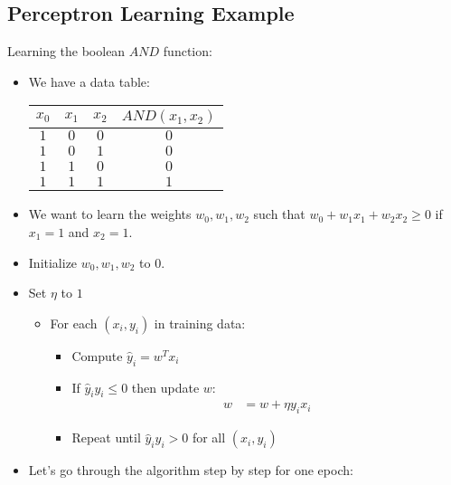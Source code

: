\documentclass[12pt]{article}
\begin{document}
        \subsection{Perceptron Learning Example}
            Learning the boolean $AND$ function:
            \begin{itemize}
                \item We have a data table: \\
                \begin{tabular}{|c|c|c|c|}
                    \hline
                    $x_0$ & $x_1$ & $x_2$ & $AND(x_1, x_2)$ \\
                    \hline
                    $1$ & $0$ & $0$ & $0$ \\
                    \hline
                    $1$ & $0$ & $1$ & $0$ \\
                    \hline
                    $1$ & $1$ & $0$ & $0$ \\
                    \hline
                    $1$ & $1$ & $1$ & $1$ \\
                    \hline
                \end{tabular}
                \item We want to learn the weights $w_0, w_1, w_2$ such that $w_0 + w_1{x_1} + w_2{x_2} \ge 0$ if $x_1 = 1$ and $x_2 = 1$.
                \item Initialize $w_0, w_1, w_2$ to $0$.
                \item Set $\eta$ to $1$
                \begin{itemize}
                    \item For each $(x_i, y_i)$ in training data:
                    \begin{itemize}
                        \item Compute $\hat{y}_i = w^T{x_i}$
                        \item If $\hat{y}_i{y_i} \le 0$ then update $w$:
                        \begin{align*}
                            w &= w + \eta{y_i}{x_i}
                        \end{align*}
                        \item Repeat until $\hat{y}_i{y_i} > 0$ for all $(x_i, y_i)$
                    \end{itemize}
                \end{itemize}
                \item Let's go through the algorithm step by step for one epoch:

\end{itemize}
\end{document}
